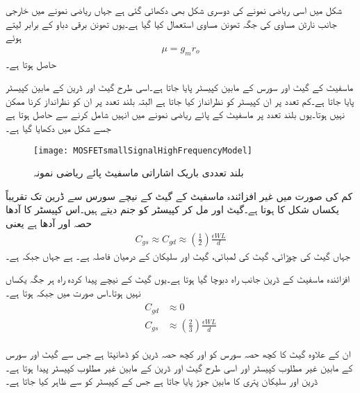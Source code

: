 شکل  میں اسی ریاضی نمونے کی دوسری شکل بھی دکھائی گئی ہے جہاں ریاضی نمونے میں خارجی جانب نارٹن مساوی کی جگہ تھونن مساوی استعمال کیا گیا ہے۔یوں تھونن برقی دباو  کے برابر لیتے ہوئے
\begin{align*}
\mu=g_m r_o
\end{align*} 
حاصل ہوتا ہے۔

ماسفیٹ کے گیٹ اور سورس کے مابین  کپیسٹر پایا جاتا ہے۔اسی طرح گیٹ اور ڈرین کے مابین  کپیسٹر پایا جاتا ہے۔کم تعدد پر ان کپیسٹر کو نظرانداز کیا جاتا ہے البتہ بلند تعدد پر ان کو نظرانداز کرنا ممکن نہیں ہوتا۔یوں بلند تعدد پر ماسفیٹ کے پائے ریاضی نمونے میں انہیں شامل کرنے سے  حاصل ہوتا ہے جسے شکل  میں دکھایا گیا ہے۔
\begin{figure}
\centering
\texttt{[image: MOSFETsmallSignalHighFrequencyModel]}
\caption{بلند تعددی باریک اشاراتی ماسفیٹ پائے ریاضی نمونہ}
\label{شکل_باریک_اشاراتی_بلند_تعددی_ماسفیٹ_ماڈل}
\end{figure}
کم  کی صورت میں غیر افزائندہ ماسفیٹ کے گیٹ کے  نیچے  سورس سے ڈرین تک تقریباً یکساں شکل کا ہوتا ہے۔گیٹ اور  مل کر کپیسٹر  کو جنم دیتے ہیں۔اس کپیسٹر کا آدھا حصہ  اور آدھا  ہے یعنی
\begin{align}
C_{gs} \approx C_{gd} \approx \left(\frac{1}{2} \right)\frac{\epsilon W L}{d}
\end{align} 
جہاں   گیٹ کی چوڑائی،  گیٹ کی لمبائی،  گیٹ اور سلیکان کے درمیان فاصلہ ہے۔ ہے جہاں  جبکہ  ہے۔

افزائندہ ماسفیٹ کے ڈرین جانب راہ دبوچا گیا ہوتا ہے۔یوں گیٹ کے نیچے پیدا کردہ راہ ہر جگہ یکساں نہیں  ہوتا۔اس صورت میں  جبکہ  ہوتا ہے۔
\begin{gather}
\begin{aligned}
C_{gd}& \approx 0\\
C_{gs}& \approx \left(\frac{2}{3}\right) \frac{\epsilon WL}{d}
\end{aligned}
\end{gather} 

ان کے علاوہ گیٹ کا کچھ حصہ سورس کو اور کچھ حصہ ڈرین کو ڈھانپتا ہے  جس سے گیٹ اور سورس کے مابین غیر مطلوب کپیسٹر  اور اسی طرح گیٹ اور ڈرین کے مابین غیر مطلوب کپیسٹر  پیدا ہوتا ہے۔ڈرین اور سلیکان پتری کا مابین  جوڑ پایا جاتا ہے جس کے کپیسٹر کو  سے ظاہر کیا جاتا ہے۔


